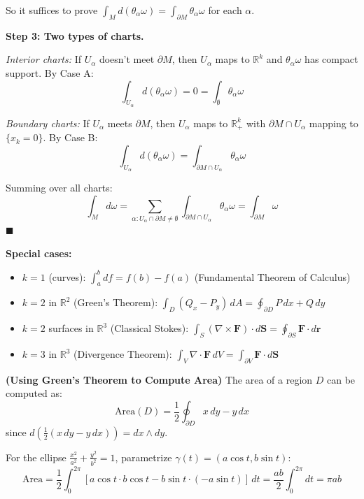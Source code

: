 \documentclass[11pt, letterpaper, openany]{book}
\renewenvironment{proof}[1][\proofname]{%
  \tcolorbox[blanker, breakable, left=1em,
    before skip=1em, after skip=1em,
    borderline west={2pt}{0pt}{MagicTeal!50},
    colback=MagicCream,
    before upper={\textcolor{MagicTeal}{\sffamily\bfseries #1.}\space}
  ]%
}{%
  \hfill\textcolor{MagicTeal}{\ensuremath{\blacksquare}}\endtcolorbox%
}
\begin{document}
\begin{proof}
So it suffices to prove $\int_M d(\theta_\alpha \omega) = \int_{\partial M} \theta_\alpha \omega$ for each $\alpha$.

\textbf{Step 3: Two types of charts.}

\textit{Interior charts:} If $U_\alpha$ doesn't meet $\partial M$, then $U_\alpha$ maps to $\mathbb{R}^k$ and $\theta_\alpha \omega$ has compact support. By Case A:
\[\int_{U_\alpha} d(\theta_\alpha \omega) = 0 = \int_{\emptyset} \theta_\alpha \omega\]

\textit{Boundary charts:} If $U_\alpha$ meets $\partial M$, then $U_\alpha$ maps to $\mathbb{R}^k_+$ with $\partial M \cap U_\alpha$ mapping to $\{x_k = 0\}$. By Case B:
\[\int_{U_\alpha} d(\theta_\alpha \omega) = \int_{\partial M \cap U_\alpha} \theta_\alpha \omega\]

Summing over all charts:
\[\int_M d\omega = \sum_{\alpha: U_\alpha \cap \partial M \neq \emptyset} \int_{\partial M \cap U_\alpha} \theta_\alpha \omega = \int_{\partial M} \omega\]
\end{proof}

\textbf{Special cases:}
\begin{itemize}
    \item $k = 1$ (curves): $\int_a^b df = f(b) - f(a)$ (Fundamental Theorem of Calculus)
    \item $k = 2$ in $\mathbb{R}^2$ (Green's Theorem): $\int_D (Q_x - P_y) \, dA = \oint_{\partial D} P\,dx + Q\,dy$
    \item $k = 2$ surfaces in $\mathbb{R}^3$ (Classical Stokes): $\int_S (\nabla \times \mathbf{F}) \cdot d\mathbf{S} = \oint_{\partial S} \mathbf{F} \cdot d\mathbf{r}$
    \item $k = 3$ in $\mathbb{R}^3$ (Divergence Theorem): $\int_V \nabla \cdot \mathbf{F} \, dV = \int_{\partial V} \mathbf{F} \cdot d\mathbf{S}$
\end{itemize}

\begin{example}
\textbf{(Using Green's Theorem to Compute Area)}
The area of a region $D$ can be computed as:
\[\text{Area}(D) = \frac{1}{2} \oint_{\partial D} x\,dy - y\,dx\]
since $d(\frac{1}{2}(x\,dy - y\,dx)) = dx \wedge dy$.

For the ellipse $\frac{x^2}{a^2} + \frac{y^2}{b^2} = 1$, parametrize $\gamma(t) = (a\cos t, b\sin t)$:
\[\text{Area} = \frac{1}{2} \int_0^{2\pi} [a\cos t \cdot b\cos t - b\sin t \cdot (-a\sin t)]\,dt = \frac{ab}{2} \int_0^{2\pi} dt = \pi ab\]
\end{example}
\end{document}
